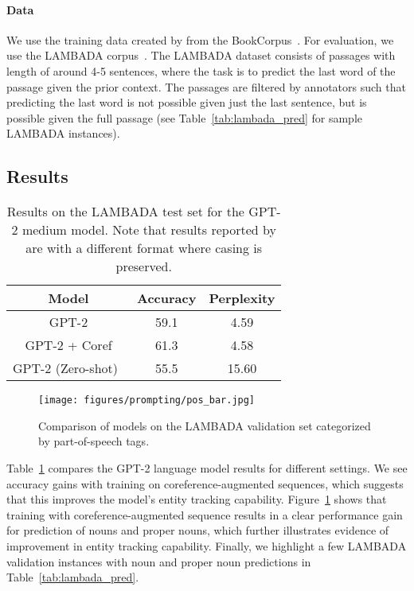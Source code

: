 \documentclass[12pt]{thesis-umich}[thesis]
\begin{document}
\paragraph{Data}
We use the training data created by \citet{chu-etal-2017-broad} from the BookCorpus~\cite{Zhu2015AligningBA}. For evaluation, we use the LAMBADA corpus~\cite{paperno-etal-2016-lambada}. The LAMBADA dataset consists of passages with length of around 4-5 sentences, where the task is to predict the last word of the passage given the prior context. The passages are filtered by annotators such that predicting the last word is not possible given just the last sentence, but is possible given the full passage (see Table~\ref{tab:lambada_pred} for sample LAMBADA instances). 




\subsection{Results}
\begin{table}[t]
    \centering
    \begin{tabular}{c c c }
    \toprule
    \textbf{Model} & \textbf{Accuracy} & \textbf{Perplexity}  \\ \midrule
    GPT-2 & 59.1 & \phantom{1}4.59 \\
    GPT-2 + Coref & 61.3 & \phantom{1}4.58 \\ 
    \midrule
    GPT-2 (Zero-shot)~\cite{radford2019language} & 55.5 & 15.60 \\\bottomrule
    
    \end{tabular}
    \caption{Results on the LAMBADA test set for the GPT-2 medium model. Note that results reported by \citet{radford2019language} are with a different format where casing is preserved.}
    \label{tab:lambada_res}
\end{table}

\begin{figure}[t]
    \centering
    \texttt{[image: figures/prompting/pos\_bar.jpg]}
    \caption{Comparison of models on the LAMBADA validation set categorized by part-of-speech tags.}
    \label{fig:pos_comp}
\end{figure}

Table~\ref{tab:lambada_res} compares the GPT-2 language model results for  different settings. We see accuracy gains with training on coreference-augmented sequences, which suggests that this improves the model's entity tracking capability. 
Figure~\ref{fig:pos_comp} shows that training with coreference-augmented sequence results in a clear performance gain for prediction of nouns and proper nouns, which further illustrates evidence of improvement in entity tracking capability. 
Finally, we highlight a few LAMBADA validation instances with noun and proper noun predictions in Table~\ref{tab:lambada_pred}. 
\end{document}
